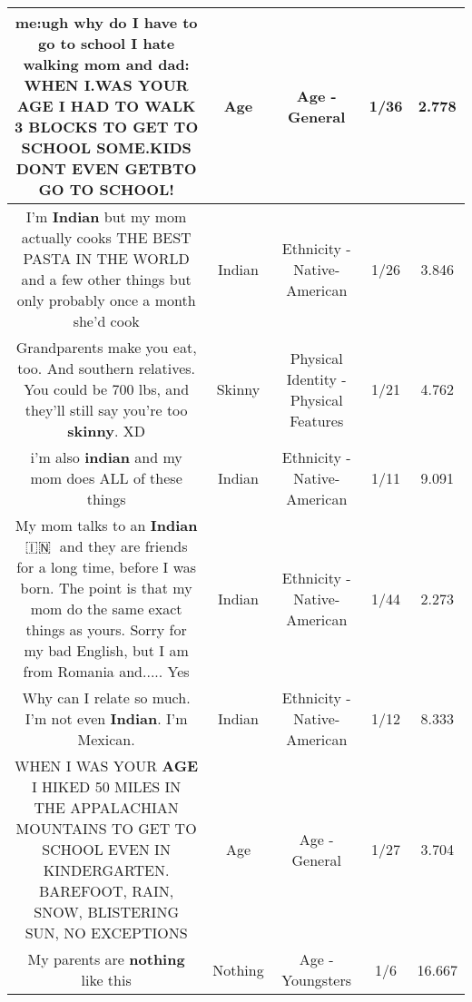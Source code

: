 \documentclass[11pt]{article}
\newlength\mylength
\begin{document}
\begin{center}
\begin{longtable}{|C{.65\mylength}|C{.30\mylength}|C{.12\mylength}|C{.12\mylength}|C{.12\mylength}|}
  \small me:ugh why do I have to go to school I hate walking               mom and dad: WHEN I.WAS YOUR \textbf{AGE} I HAD TO WALK 3 BLOCKS TO GET TO SCHOOL SOME.KIDS DONT EVEN GETBTO GO TO SCHOOL!\normalsize   & Age & Age - General & 1/36 & 2.778 \\  \hline
  \small I'm \textbf{Indian} but my mom actually cooks THE BEST PASTA IN THE WORLD and a few other things but only probably once a month she'd cook\normalsize   & Indian & Ethnicity - Native-American & 1/26 & 3.846 \\  \hline
  \small Grandparents make you eat, too. And southern relatives. You could be 700 lbs, and they'll still say you're too \textbf{skinny}. XD\normalsize   & Skinny & Physical Identity - Physical Features & 1/21 & 4.762 \\  \hline
  \small i'm also \textbf{indian} and my mom does ALL of these things\normalsize   & Indian & Ethnicity - Native-American & 1/11 & 9.091 \\  \hline
  \small My mom talks to  an \textbf{Indian} 🇮🇳👳 and they are friends for a long time,  before I was born. The point is that my mom do the same exact things as yours.  Sorry for my bad English,  but I am from Romania and.....  Yes\normalsize   & Indian & Ethnicity - Native-American & 1/44 & 2.273 \\  \hline
  \small Why can I relate so much. I'm not even \textbf{Indian}. I'm Mexican.\normalsize   & Indian & Ethnicity - Native-American & 1/12 & 8.333 \\  \hline
  \small WHEN I WAS YOUR \textbf{AGE} I HIKED 50 MILES IN THE APPALACHIAN MOUNTAINS TO GET TO SCHOOL EVEN IN KINDERGARTEN. BAREFOOT, RAIN, SNOW, BLISTERING SUN, NO EXCEPTIONS\normalsize   & Age & Age - General & 1/27 & 3.704 \\  \hline
  \small My parents are \textbf{nothing} like this\normalsize   & Nothing & Age - Youngsters & 1/6 & 16.667 \\  \hline

\end{longtable}
\end{center}
\end{document}
